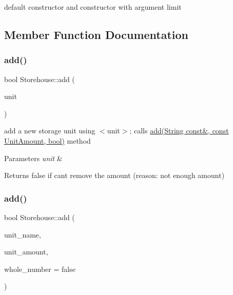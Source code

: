 default constructor and constructor with argument limit 



\subsection{Member Function Documentation}
\mbox{\label{classStorehouse_abd7448c73850f9281174e13a918e4c14}} 
\subsubsection{\texorpdfstring{add()}{add()}\hspace{0.1cm}{\footnotesize\ttfamily [1/2]}}
{\footnotesize\ttfamily bool Storehouse\+::add (\begin{DoxyParamCaption}\item[{const \hyperlink{classStorageUnit}{Storage\+Unit} \&}]{unit }\end{DoxyParamCaption})}

add a new storage unit using $<$unit$>$; calls \hyperlink{classStorehouse_aeb07631e19d9fa3306b49988ce8ce6fb}{add(\+String const\&, const Unit\+Amount, bool)} method 
\begin{DoxyParams}{Parameters}
{\em unit} & \\
\hline
\end{DoxyParams}
\begin{DoxyReturn}{Returns}
false if can\textquotesingle{}t remove the amount (reason\+: not enough amount) 
\end{DoxyReturn}
\mbox{\label{classStorehouse_aeb07631e19d9fa3306b49988ce8ce6fb}} 
\subsubsection{\texorpdfstring{add()}{add()}\hspace{0.1cm}{\footnotesize\ttfamily [2/2]}}
{\footnotesize\ttfamily bool Storehouse\+::add (\begin{DoxyParamCaption}\item[{\hyperlink{classString}{String} const \&}]{unit\+\_\+name,  }\item[{const \hyperlink{StorageUnit_8hpp_a13b2ba6b0400e1aa0b57282bd1228f20}{Unit\+Amount}}]{unit\+\_\+amount,  }\item[{bool}]{whole\+\_\+number = {\ttfamily false} }\end{DoxyParamCaption})}

